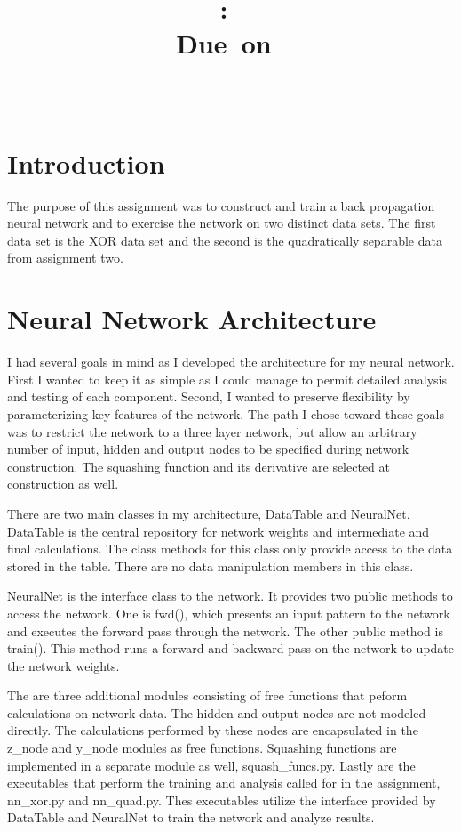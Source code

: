 \documentclass{article}
\title{\vspace{2in}\textmd{\textbf{\hmwkClass:\ \hmwkTitle\ifthenelse{\equal{\hmwkSubTitle}{}}{}{\\\hmwkSubTitle}}}\\\normalsize\vspace{0.1in}\small{Due\ on\ \hmwkDueDate}\\\vspace{0.1in}\large{\textit{\hmwkClassInstructor\ \hmwkClassTime}}\vspace{3in}}
\date{}
\author{\textbf{\hmwkAuthorName}}
\begin{document}
\maketitle

\section*{Introduction}
The purpose of this assignment was to construct and train a back
propagation neural network and to exercise the network on two distinct
data sets.  The first data set is the XOR data set and the second is
the quadratically separable data from assignment two.

\section*{Neural Network Architecture}
I had several goals in mind as I developed the architecture for my
neural network.  First I wanted to keep it as simple as I could manage
to permit detailed analysis and testing of each component.  Second, I
wanted to preserve flexibility by parameterizing key features of the
network.  The path I chose toward these goals was to restrict the
network to a three layer network, but allow an arbitrary number of
input, hidden and output nodes to be specified during network
construction. The squashing function and its derivative are selected
at construction as well.

There are two main classes in my architecture, DataTable and
NeuralNet. DataTable is the central repository for network weights and
intermediate and final calculations.  The class methods for this class
only provide access to the data stored in the table. There are no data
manipulation members in this class.

NeuralNet is the interface class to the network.  It provides two
public methods to access the network.  One is fwd(), which presents an
input pattern to the network and executes the forward pass through the
network. The other public method is train().  This method runs a
forward and backward pass on the network to update the network
weights.

The are three additional modules consisting of free functions that
peform calculations on network data.  The hidden and output nodes are
not modeled directly.  The calculations performed by these nodes are
encapsulated in the z\_node and y\_node modules as free functions.
Squashing functions are implemented in a separate module as well,
squash\_funcs.py.  Lastly are the executables that perform the training
and analysis called for in the assignment, nn\_xor.py and nn\_quad.py.  Thes executables utilize the interface provided by DataTable and NeuralNet to train the network and analyze results.
\end{document}

